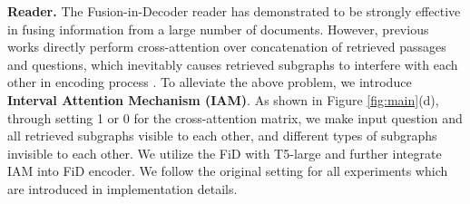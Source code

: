 \documentclass[sigconf,natbib=true,anonymous=False]{acmart}
\begin{document}
\textbf{Reader.} The Fusion-in-Decoder\cite{izacard2020leveraging} reader has demonstrated to be strongly effective in fusing information from a large number of documents. However, previous works directly perform cross-attention over concatenation of retrieved passages and questions, which inevitably causes retrieved subgraphs to interfere with each other in encoding process \cite{de2022fido}. To alleviate the above problem, we introduce \textbf{Interval Attention Mechanism (IAM)}. As shown in Figure \ref{fig:main}(d), through setting 1 or 0 for the cross-attention matrix, we make input question and all retrieved subgraphs visible to each other, and different types of subgraphs invisible to each other. We utilize the FiD with T5-large \cite{raffel2020exploring} and further integrate IAM into FiD encoder. We follow the original setting for all experiments which are introduced in implementation details.
\end{document}

